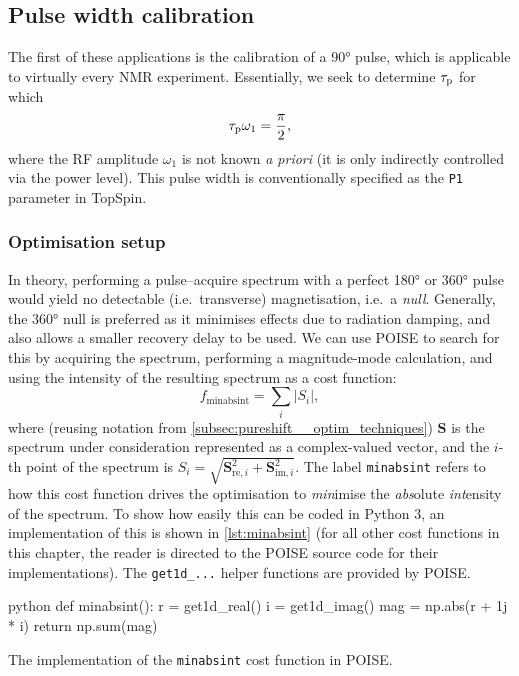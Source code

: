 \subsection{Pulse width calibration}
\label{subsec:poise__pulsecal}

The first of these applications is the calibration of a \ang{90} \proton{} pulse, which is applicable to virtually every NMR experiment.
Essentially, we seek to determine $\tau_\mathrm{p}$ for which
\begin{equation}
    \label{eq:pw90}
    \tau_\mathrm{p} \omega_1 = \frac{\pi}{2},
\end{equation}
where the RF amplitude $\omega_1$ is not known \textit{a priori} (it is only indirectly controlled via the power level).
This pulse width is conventionally specified as the \texttt{P1} parameter in TopSpin.

\subsubsection{Optimisation setup}

In theory, performing a pulse--acquire spectrum with a perfect \ang{180} or \ang{360} pulse would yield no detectable (i.e.\ transverse) magnetisation, i.e.\ a \textit{null}.
Generally, the \ang{360} null is preferred as it minimises effects due to radiation damping, and also allows a smaller recovery delay to be used.
We can use POISE to search for this by acquiring the spectrum, performing a magnitude-mode calculation, and using the intensity of the resulting spectrum as a cost function:
\begin{equation}
    \label{eq:minabsint}
    f_\mathrm{minabsint} = \sum_i |S_i|,
\end{equation}
where (reusing notation from \cref{subsec:pureshift__optim_techniques}) $\symbf{S}$ is the spectrum under consideration represented as a complex-valued vector, and the $i$-th point of the spectrum is $S_i = \sqrt{\symbf{S}_{\text{re},i}^2 + \symbf{S}_{\text{im},i}^2}$.
The label \texttt{minabsint} refers to how this cost function drives the optimisation to \textit{min}imise the \textit{abs}olute \textit{int}ensity of the spectrum.
To show how easily this can be coded in Python 3, an implementation of this is shown in \cref{lst:minabsint} (for all other cost functions in this chapter, the reader is directed to the POISE source code for their implementations).
The \texttt{get1d\_...} helper functions are provided by POISE.

\begin{mylisting}[htb]
\begin{tcbminted}{python}
def minabsint():
    r = get1d_real()
    i = get1d_imag()
    mag = np.abs(r + 1j * i)
    return np.sum(mag)
\end{tcbminted}
\caption[Implementation of \texttt{minabsint} cost function]{The implementation of the \texttt{minabsint} cost function in POISE.}
\label{lst:minabsint}
\end{mylisting}

